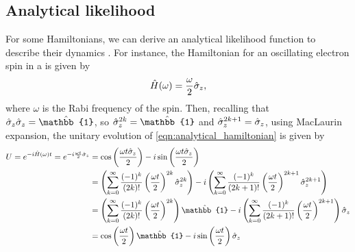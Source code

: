 \subsection{Analytical likelihood}\label{sec:analytical_likelihood}
For some Hamiltonians, we can derive an analytical \gls{likelihood} function to describe their dynamics
    \cite{sergeevich2011characterization, ferrie2013best}.
For instance, the Hamiltonian for an oscillating electron spin in a  
    is given by
    \begin{equation}
        \label{eqn:analytical_hamiltonian}
        \hat{H}(\omega) = \frac{\omega}{2} \hat{\sigma}_z,
    \end{equation}
    where $\omega$ is the Rabi frequency of the spin. 
Then, recalling that $\s_z \s_z = \hat{\mathbb{1}}$, so $\s_z^{2k}=\hat{\mathbb{1}}$ and $\hat{\sigma}_z^{2k+1} = \hat{\sigma}_z$, 
    using MacLaurin expansion, the unitary evolution of \cref{eqn:analytical_hamiltonian} is given by 
\begin{align}
    \begin{split}
        U = e^{-i \hat{H}(\omega)t} = e^{-i \frac{\omega t}{2} \s_z}  
        &= \cos\bk{ \frac{\omega t \s_z}{2}} 
        - i \sin\bk{ \frac{\omega t \s_z}{2}} \\
        &= \bk{ \sum\limits_{k=0}^{\infty} \frac{(-1)^k}{(2k)!} \bk{ \frac{\omega t}{2} }^{2k} \s_z^{2k}  }
        - i \bk{\sum\limits_{k=0}^{\infty} \frac{(-1)^k}{(2k+1)!} \bk{ \frac{\omega t}{2} }^{2k+1} \s_z^{2k+1}} \\
        &=  \bk{\sum\limits_{k=0}^{\infty} \frac{(-1)^k}{(2k)!} \bk{ \frac{\omega t}{2} }^{2k}} \hat{\mathbb{1}} 
        - i \bk{\sum\limits_{k=0}^{\infty} \frac{(-1)^k}{(2k+1)!} \bk{ \frac{\omega t}{2} }^{2k+1} } \s_z \\
        &= \cos\bk{\frac{\omega t}{2}}\hat{\mathbb{1}} - i \sin\bk{\frac{\omega t}{2}} \s_z
    \end{split}
\end{align}
    
